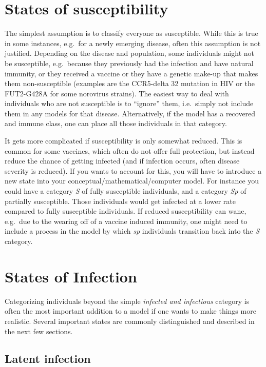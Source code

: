 \documentclass[]{book}
\theoremstyle{definition}
\theoremstyle{definition}
\theoremstyle{definition}
\theoremstyle{remark}
\begin{document}
\section{States of susceptibility}\label{states-of-susceptibility}

The simplest assumption is to classify everyone as susceptible. While
this is true in some instances, e.g.~for a newly emerging disease, often
this assumption is not justified. Depending on the disease and
population, some individuals might not be susceptible, e.g.~because they
previously had the infection and have natural immunity, or they received
a vaccine or they have a genetic make-up that makes them non-susceptible
(examples are the CCR5-delta 32 mutation in HIV or the FUT2-G428A for
some norovirus strains). The easiest way to deal with individuals who
are not susceptible is to ``ignore'' them, i.e.~simply not include them
in any models for that disease. Alternatively, if the model has a
recovered and immune class, one can place all those individuals in that
category.

It gets more complicated if susceptibility is only somewhat reduced.
This is common for some vaccines, which often do not offer full
protection, but instead reduce the chance of getting infected (and if
infection occurs, often disease severity is reduced). If you wants to
account for this, you will have to introduce a new state into your
conceptual/mathematical/computer model. For instance you could have a
category \emph{S} of fully susceptible individuals, and a category
\emph{Sp} of partially susceptible. Those individuals would get infected
at a lower rate compared to fully susceptible individuals. If reduced
susceptibility can wane, e.g.~due to the wearing off of a vaccine
induced immunity, one might need to include a process in the model by
which \emph{sp} individuals transition back into the \emph{S} category.

\section{States of Infection}\label{states-of-infection}

Categorizing individuals beyond the simple \emph{infected and
infectious} category is often the most important addition to a model if
one wants to make things more realistic. Several important states are
commonly distinguished and described in the next few sections.

\subsection{Latent infection}\label{latent-infection}
\end{document}
